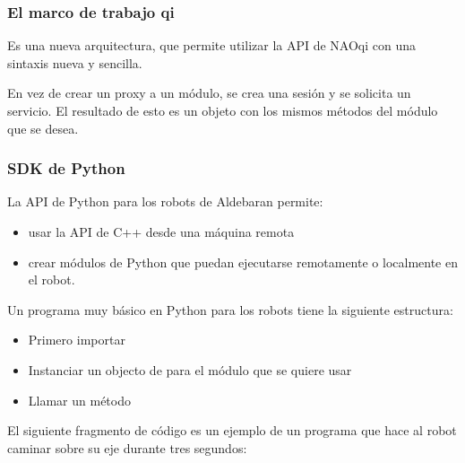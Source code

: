 \subsubsection{El marco de trabajo qi}
\label{\detokenize{chapter_one/naoqi:el-marco-de-trabajo-qi}}
Es una nueva arquitectura, que permite utilizar la API de NAOqi con una sintaxis
nueva y sencilla.

En vez de crear un proxy a un módulo, se crea una sesión y se solicita un
servicio. El resultado de esto es un objeto con los mismos métodos del
módulo que se desea.


\subsubsection{SDK de Python}
\label{\detokenize{chapter_one/naoqi:sdk-de-python}}
La API de Python para los robots de Aldebaran permite:
\begin{itemize}
\item {} 
usar la API de C++ desde una máquina remota

\item {} 
crear módulos de Python que puedan ejecutarse remotamente o localmente en el robot.

\end{itemize}

Un programa muy básico en Python para los robots tiene la siguiente estructura:
\begin{itemize}
\item {} 
Primero importar 

\item {} 
Instanciar un objecto de  para el módulo que se quiere usar

\item {} 
Llamar un método

\end{itemize}

El siguiente fragmento de código es un ejemplo de un programa que hace al robot
caminar sobre su eje  durante tres segundos:

